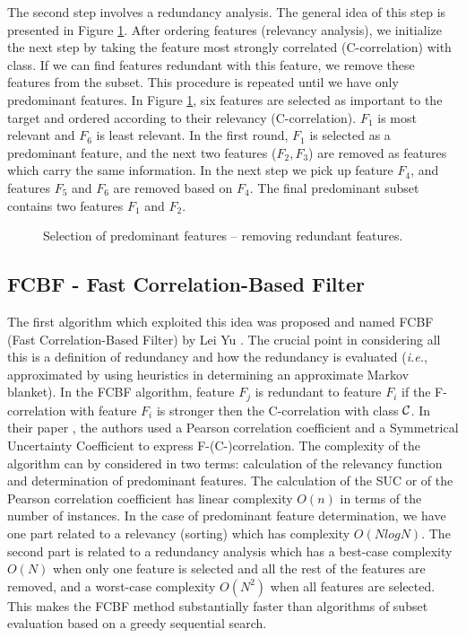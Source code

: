 \documentclass[a4paper,fleqn]{report}
\def\ie{{\em i.e.}}
\newcommand\cC{{\cal C}}
\begin{document}
The second step involves a redundancy analysis. 
The general idea of this step is presented in Figure \ref{fig:idea:redun}. After ordering features (relevancy analysis), we initialize 
the next step by taking the feature most strongly correlated (C-correlation) with class. If we can find features redundant 
with this feature, we remove these features from the subset. This procedure is repeated until we have only predominant features. 
In Figure \ref{fig:idea:redun}, six features are selected as important to the target and ordered according to their relevancy 
(C-correlation). $F_1$ is most relevant and $F_6$ is least relevant. In the first round, $F_1$ is selected as a predominant feature, 
and the next two features ($F_2, F_3$) are removed as features which carry the same information. %
In the next step we pick up feature $F_4$, and features $F_5$ and $F_6$ are removed based on $F_4$.
The final predominant subset contains two features $F_1$ and $F_2$.

\begin{figure}[!htbp]  \label{fig:idea:redun}  %
\begin{minipage}[c]{1.0\linewidth}
\centering
{}
\end{minipage}
\caption{Selection of predominant features -- removing redundant features.}
\end{figure}

\subsection{FCBF - Fast Correlation-Based Filter}

The first algorithm which exploited this idea was proposed and named FCBF (Fast Correlation-Based Filter) 
by Lei Yu \cite{HuanLiu2004}. The crucial point in considering all this is a definition of redundancy and how the
redundancy is evaluated (\ie, approximated by using heuristics in determining an approximate Markov blanket). 
In the FCBF algorithm, feature $F_j$ is redundant to feature $F_i$ if the F-correlation with feature $F_i$ 
is stronger then the C-correlation with class $\cC$.
In their paper \cite{HuanLiu2004}, the authors used a Pearson correlation 
coefficient and a Symmetrical Uncertainty Coefficient \cite{Duch2004,Press1988} to express F-(C-)correlation. The complexity of the algorithm 
can by considered in two terms: calculation of the relevancy function and determination of predominant features.
The calculation of the SUC or of the Pearson correlation coefficient has linear complexity $O\left(n\right)$ in terms of the number 
of instances. In the case of predominant feature determination, we have one part related to a relevancy (sorting) which
has complexity $O\left( N logN \right)$. The second part is related to a redundancy analysis which has a best-case complexity
$O\left(N \right)$ when only one feature is selected and all the rest of the
features are removed, and a worst-case complexity $O\left( N^2 \right)$ when all features are selected. 
This makes the FCBF method substantially faster than algorithms of subset evaluation based on a greedy sequential search.
\end{document}
